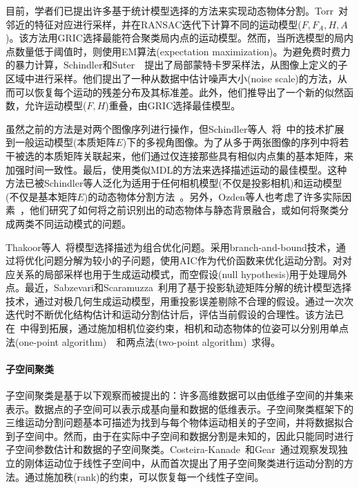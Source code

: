 目前，学者们已提出许多基于统计模型选择的方法来实现动态物体分割。Torr~\cite{faugeras1998geometric}对邻近的特征对应进行采样，并在RANSAC迭代下计算不同的运动模型($F, F_A, H, A$)。该方法用GRIC选择最能符合聚类局内点的运动模型。然而，当所选模型的局内点数量低于阈值时，则使用EM算法(expectation maximization)。为避免费时费力的暴力计算，Schindler和Suter~\cite{schindler2005two}~\cite{schindler2006two}提出了局部蒙特卡罗采样法，从图像上定义的子区域中进行采样。他们提出了一种从数据中估计噪声大小(noise scale)的方法，从而可以恢复每个运动的残差分布及其标准差。此外，他们推导出了一个新的似然函数，允许运动模型($F, H$)重叠，由GRIC选择最佳模型。

虽然之前的方法是对两个图像序列进行操作，但Schindler等人~\cite{schindler2006perspective}将~\cite{schindler2005two}中的技术扩展到一般运动模型(本质矩阵$E$)下的多视角图像。为了从多于两张图像的序列中将若干被选的本质矩阵关联起来，他们通过仅连接那些具有相似内点集的基本矩阵，来加强时间一致性。最后，使用类似MDL的方法来选择描述运动的最佳模型。这种方法已被Schindler等人泛化为适用于任何相机模型(不仅是投影相机)和运动模型(不仅是基本矩阵$E$)的动态物体分割方法~\cite{schindler2008model}。另外，Ozden等人也考虑了许多实际因素~\cite{ozden2010multibody}，他们研究了如何将之前识别出的动态物体与静态背景融合，或如何将聚类分成两类不同运动模式的问题。

Thakoor等人~\cite{thakoor2010multibody}将模型选择描述为组合优化问题。采用branch-and-bound技术，通过将优化问题分解为较小的子问题，使用AIC作为代价函数来优化运动分割。对对应关系的局部采样也用于生成运动模式，而空假设(null hypothesis)用于处理局外点。最近，Sabzevari和Scaramuzza~\cite{sabzevari2014monocular}利用了基于投影轨迹矩阵分解的统计模型选择技术，通过对极几何生成运动模型，用重投影误差剔除不合理的假设。通过一次次迭代时不断优化结构估计和运动分割估计后，评估当前假设的合理性。该方法已在~\cite{sabzevari2016multiA}中得到拓展，通过施加相机位姿约束，相机和动态物体的位姿可以分别用单点法(one-point algorithm)~\cite{scaramuzza20111A}~\cite{scaramuzza2009realA}和两点法(two-point algorithm)~\cite{ortin2001indoor}求得。


\paragraph{子空间聚类}
子空间聚类是基于以下观察而被提出的：许多高维数据可以由低维子空间的并集来表示。数据点的子空间可以表示成基向量和数据的低维表示。子空间聚类框架下的三维运动分割问题基本可描述为找到与每个物体运动相关的子空间，并将数据拟合到子空间中。然而，由于在实际中子空间和数据分割是未知的，因此只能同时进行子空间参数估计和数据的子空间聚类。Costeira-Kanade~\cite{costeira1998multibody}和Gear~\cite{gear1998multibody}通过观察发现独立的刚体运动位于线性子空间中，从而首次提出了用子空间聚类进行运动分割的方法。通过施加秩(rank)的约束，可以恢复每一个线性子空间。


